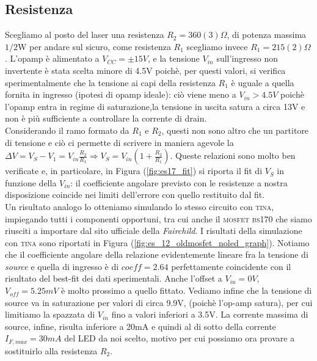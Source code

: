 \documentclass[journal, a4paper]{IEEEtran}
\begin{document}
\subsection{Resistenza}
Scegliamo al posto del laser una resistenza $R_2 = 360(3) \Omega$, di potenza massima $1/2$W per andare sul sicuro, come resistenza $R_1$ scegliamo invece $R_1 = 215(2) \Omega$. L'opamp è alimentato a $V_{CC} = \pm 15V$, e la tensione $V_{in}$ sull'ingresso non invertente è stata scelta minore di 4.5V poichè, per questi valori, si verifica sperimentalmente che la tensione ai capi della resistenza $R_1$ è uguale a quella fornita in ingresso (ipotesi di opamp ideale): ciò viene meno a $V_{in} > 4.5V$ poichè l'opamp entra in regime di saturazione,la tensione in uscita satura a circa 13V e non è più sufficiente a controllare la corrente di drain.\\
Considerando il ramo formato da $R_1$ e $R_2$, questi non sono altro che un partitore di tensione e ciò ci permette di scrivere in maniera agevole la $\Delta V = V_{S} - V_1 = V_{in} \frac{R_2}{R_1} \Rightarrow V_{S} = V_{in} (1 + \frac{R_2}{R_1})$. Queste relazioni sono molto ben verificate e, in particolare, in Figura (\ref{fig:es17_fit}) si riporta il fit di $V_S$ in funzione della $V_{in}$: il coefficiente angolare previsto con le resistenze a nostra disposizione coincide nei limiti dell'errore con quello restituito dal fit.\\
Un risultato analogo lo otteniamo simulando lo stesso circuito con \textsc{tina}, impiegando tutti i componenti opportuni, tra cui anche il \textsc{mosfet bs170} che siamo riusciti a importare dal sito ufficiale della \textit{Fairchild}. I risultati della simulazione con \textsc{tina} sono riportati in Figura (\ref{fig:es_12_oldmosfet_noled_graph}). Notiamo che il coefficiente angolare della relazione evidentemente lineare fra la tensione di \textit{source} e quella di ingresso è di $coeff = 2.64$ perfettamente coincidente con il risultato del best-fit dei dati sperimentali. Anche l'offset a $V_{in} = 0V$, $V_{off} = 5.25 \si{mV}$ è molto prossimo a quello fittato. Vediamo infine che la tensione di source va in saturazione per valori di circa 9.9V, (poichè l'op-amp satura), per cui limitiamo la spazzata di $V_{in}$ fino a valori inferiori a 3.5V. La corrente massima di source, infine, risulta inferiore a 20mA e quindi al di sotto della corrente $I_{F,max} = 30mA$ del LED da noi scelto, motivo per cui possiamo ora provare a sostituirlo alla resistenza $R_2$.\\ 
\end{document}
